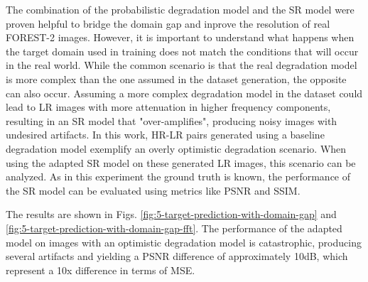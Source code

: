 

        The combination of the probabilistic degradation model and the SR model were proven helpful to bridge the domain gap and inprove the resolution of real FOREST-2 images.
        However, it is important to understand what happens when the target domain used in training does not match the conditions that will occur in the real world.
        While the common scenario is that the real degradation model is more complex than the one assumed in the dataset generation, the opposite can also occur.
        Assuming a more complex degradation model in the dataset could lead to LR images with more attenuation in higher frequency components, resulting in an SR model that "over-amplifies", producing noisy images with undesired artifacts.
        In this work, HR-LR pairs generated using a baseline degradation model exemplify an overly optimistic degradation scenario.
        When using the adapted SR model on these generated LR images, this scenario can be analyzed.
        As in this experiment the ground truth is known, the performance of the SR model can be evaluated using metrics like PSNR and SSIM.
        
        The results are shown in Figs. \ref{fig:5-target-prediction-with-domain-gap} and \ref{fig:5-target-prediction-with-domain-gap-fft}.
        The performance of the adapted model on images with an optimistic degradation model is catastrophic, producing several artifacts and yielding a PSNR difference of approximately 10dB, which represent a 10x difference in terms of MSE.

